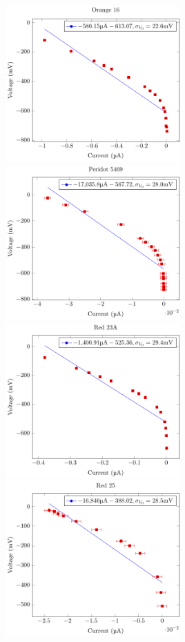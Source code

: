 \documentclass[a4paper]{article}
\begin{document}
\includegraphics[width=0.5\textwidth]{P1-PlanksConstant/Plots/Orange16/orange16.pdf}
\includegraphics[width=0.5\textwidth]{P1-PlanksConstant/Plots/Peridot5469/peridot5469.pdf}
\includegraphics[width=0.5\textwidth]{P1-PlanksConstant/Plots/Red23A/red23A.pdf}
\includegraphics[width=0.5\textwidth]{P1-PlanksConstant/Plots/Red25/red25.pdf}
\end{document}
